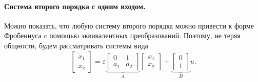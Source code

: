 \documentclass[../main.tex]{subfiles}
\begin{document}
 \paragraph{Система второго порядка с одним входом.}
 Можно показать, что любую систему второго порядка можно привести к форме Фробениуса c помощью эквивалентных преобразований. Поэтому, не теряя общности, будем рассматривать системы вида
 \begin{equation}\label{system32}
	 \left[ {\begin{array}{*{20}{c}}
			 {{{\dot x}_1}}\\
			 {{{\dot x}_2}}
	 \end{array}} \right] = \varepsilon \underbrace {\left[ {\begin{array}{*{20}{c}}
				 0&1\\
				 a_1&a_2
		 \end{array}} \right]}_A\left[ {\begin{array}{*{20}{c}}
			 {{x_1}}\\
			 {{x_2}}
	 \end{array}} \right] + \underbrace {\left[ {\begin{array}{*{20}{c}}
				 0\\
				 1
		 \end{array}} \right]}_Bu.
 \end{equation}
 
\end{document}
